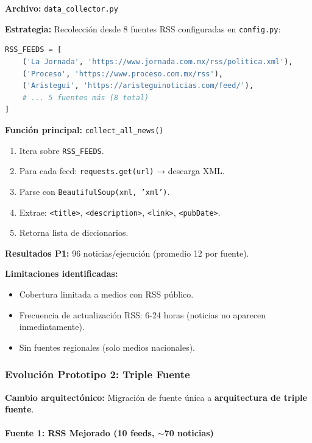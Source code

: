 \textbf{Archivo:} \texttt{data\_collector.py}

\textbf{Estrategia:} Recolección desde 8 fuentes RSS configuradas en \texttt{config.py}:

\begin{lstlisting}[language=Python, caption={Configuración RSS del Prototipo 1}]
RSS_FEEDS = [
    ('La Jornada', 'https://www.jornada.com.mx/rss/politica.xml'),
    ('Proceso', 'https://www.proceso.com.mx/rss'),
    ('Aristegui', 'https://aristeguinoticias.com/feed/'),
    # ... 5 fuentes más (8 total)
]
\end{lstlisting}

\textbf{Función principal:} \texttt{collect\_all\_news()}

\begin{enumerate}
    \item Itera sobre \texttt{RSS\_FEEDS}.
    \item Para cada feed: \texttt{requests.get(url)} → descarga XML.
    \item Parse con \texttt{BeautifulSoup(xml, 'xml')}.
    \item Extrae: \texttt{<title>}, \texttt{<description>}, \texttt{<link>}, \texttt{<pubDate>}.
    \item Retorna lista de diccionarios.
\end{enumerate}

\textbf{Resultados P1:} 96 noticias/ejecución (promedio 12 por fuente).

\textbf{Limitaciones identificadas:}
\begin{itemize}
    \item Cobertura limitada a medios con RSS público.
    \item Frecuencia de actualización RSS: 6-24 horas (noticias no aparecen inmediatamente).
    \item Sin fuentes regionales (solo medios nacionales).
\end{itemize}

\subsubsection{Evolución Prototipo 2: Triple Fuente}

\textbf{Cambio arquitectónico:} Migración de fuente única a \textbf{arquitectura de triple fuente}.

\paragraph{Fuente 1: RSS Mejorado (10 feeds, $\sim$70 noticias)}

